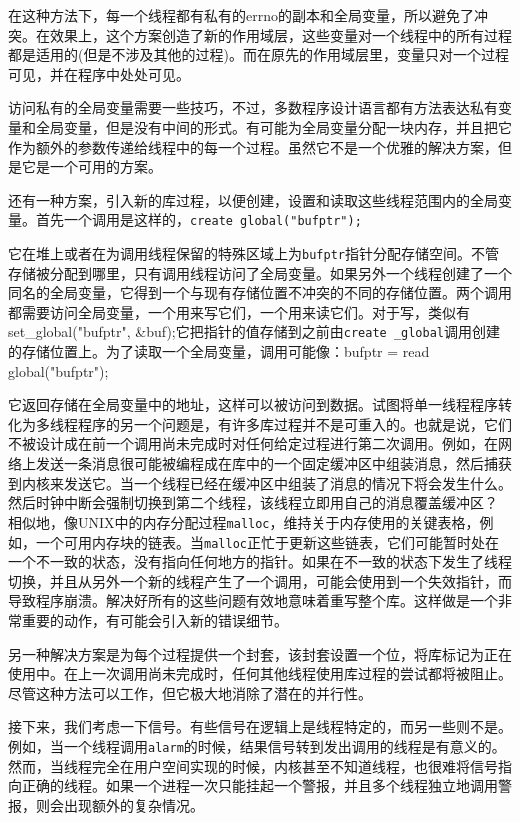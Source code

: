 	在这种方法下，每一个线程都有私有的errno的副本和全局变量，所以避免了冲突。在效果上，这个方案创造了新的作用域层，这些变量对一个线程中的所有过程都是适用的(但是不涉及其他的过程)。而在原先的作用域层里，变量只对一个过程可见，并在程序中处处可见。
	
	访问私有的全局变量需要一些技巧，不过，多数程序设计语言都有方法表达私有变量和全局变量，但是没有中间的形式。有可能为全局变量分配一块内存，并且把它作为额外的参数传递给线程中的每一个过程。虽然它不是一个优雅的解决方案，但是它是一个可用的方案。
	
	还有一种方案，引入新的库过程，以便创建，设置和读取这些线程范围内的全局变量。首先一个调用是这样的，\texttt{create global("bufptr");}
	
	它在堆上或者在为调用线程保留的特殊区域上为\texttt{bufptr}指针分配存储空间。不管存储被分配到哪里，只有调用线程访问了全局变量。如果另外一个线程创建了一个同名的全局变量，它得到一个与现有存储位置不冲突的不同的存储位置。两个调用都需要访问全局变量，一个用来写它们，一个用来读它们。对于写，类似有set\_global("bufptr", \&buf);它把指针的值存储到之前由\texttt{create \_global}调用创建的存储位置上。为了读取一个全局变量，调用可能像：bufptr = read global("bufptr");
	
	它返回存储在全局变量中的地址，这样可以被访问到数据。试图将单一线程程序转化为多线程程序的另一个问题是，有许多库过程并不是可重入的。也就是说，它们不被设计成在前一个调用尚未完成时对任何给定过程进行第二次调用。例如，在网络上发送一条消息很可能被编程成在库中的一个固定缓冲区中组装消息，然后捕获到内核来发送它。当一个线程已经在缓冲区中组装了消息的情况下将会发生什么。然后时钟中断会强制切换到第二个线程，该线程立即用自己的消息覆盖缓冲区？
	相似地，像UNIX中的内存分配过程\texttt{malloc}，维持关于内存使用的关键表格，例如，一个可用内存块的链表。当\texttt{malloc}正忙于更新这些链表，它们可能暂时处在一个不一致的状态，没有指向任何地方的指针。如果在不一致的状态下发生了线程切换，并且从另外一个新的线程产生了一个调用，可能会使用到一个失效指针，而导致程序崩溃。解决好所有的这些问题有效地意味着重写整个库。这样做是一个非常重要的动作，有可能会引入新的错误细节。
	
	另一种解决方案是为每个过程提供一个封套，该封套设置一个位，将库标记为正在使用中。在上一次调用尚未完成时，任何其他线程使用库过程的尝试都将被阻止。尽管这种方法可以工作，但它极大地消除了潜在的并行性。
	
	接下来，我们考虑一下信号。有些信号在逻辑上是线程特定的，而另一些则不是。例如，当一个线程调用\texttt{alarm}的时候，结果信号转到发出调用的线程是有意义的。然而，当线程完全在用户空间实现的时候，内核甚至不知道线程，也很难将信号指向正确的线程。如果一个进程一次只能挂起一个警报，并且多个线程独立地调用警报，则会出现额外的复杂情况。
	
